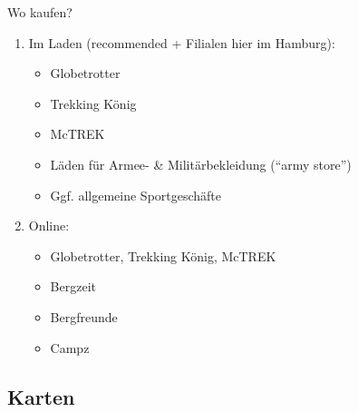 \documentclass[aspectratio=169]{beamer}
\begin{document}
			
			\begin{frame}{Wo kaufen?}
				\begin{enumerate}
					\item Im Laden (recommended + Filialen hier im Hamburg):
					\begin{itemize}
						\item Globetrotter
						\item Trekking König
						\item McTREK
						\item Läden für Armee- \& Militärbekleidung ("`army store"')
						\item Ggf. allgemeine Sportgeschäfte
					\end{itemize}\pause
					\item Online:
					\begin{itemize}
						\item Globetrotter, Trekking König, McTREK
						\item Bergzeit
						\item Bergfreunde
						\item Campz
					\end{itemize}
				\end{enumerate}
			\end{frame}
		
		\subsection{Karten}
			
\end{document}
